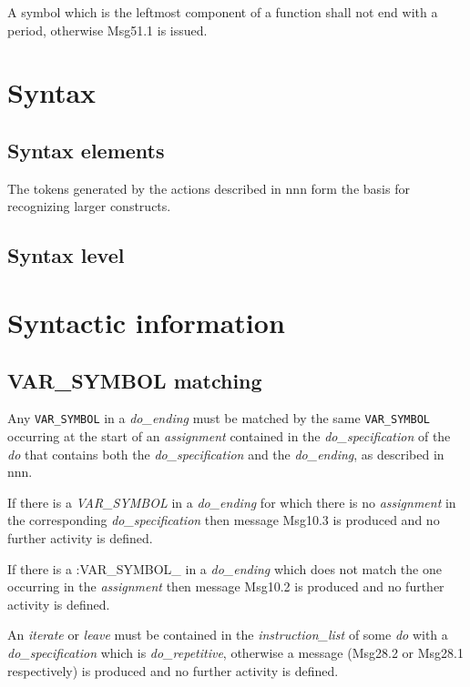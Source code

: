 A symbol which is the leftmost component of a function shall not end
with a period, otherwise Msg51.1 is issued.

\section{Syntax}\label{syntax}

\subsection{Syntax elements}\label{syntax-elements}

The tokens generated by the actions described in nnn form the basis for
recognizing larger constructs.

\subsection{Syntax level}\label{syntax-level}



\section{Syntactic information}\label{syntactic-information}

\subsection{VAR\_SYMBOL matching}\label{var_symbol-matching}

Any \texttt{VAR\_SYMBOL} in a \emph{do\_ending} must be matched by the
same \texttt{VAR\_SYMBOL} occurring at the start of an \emph{assignment}
contained in the \emph{do\_specification} of the \emph{do} that contains
both the \emph{do\_specification} and the \emph{do\_ending}, as
described in nnn.

If there is a \emph{VAR\_SYMBOL} in a \emph{do\_ending} for which there
is no \emph{assignment} in the corresponding \emph{do\_specification}
then message Msg10.3 is produced and no further activity is defined.

If there is a :VAR\_SYMBOL\_ in a \emph{do\_ending} which does not match
the one occurring in the \emph{assignment} then message Msg10.2 is
produced and no further activity is defined.

An \emph{iterate} or \emph{leave} must be contained in the
\emph{instruction\_list} of some \emph{do} with a
\emph{do\_specification} which is \emph{do\_repetitive}, otherwise a
message (Msg28.2 or Msg28.1 respectively) is produced and no further
activity is defined.

